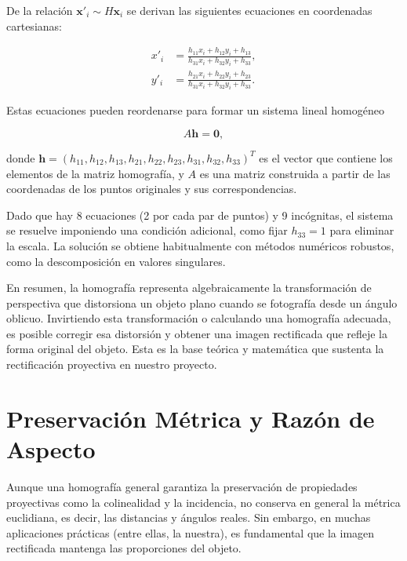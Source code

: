 De la relación \(\mathbf{x}'_i \sim H \mathbf{x}_i\) se derivan las siguientes ecuaciones en coordenadas cartesianas:

\begin{align}
x'_i &= \frac{h_{11} x_i + h_{12} y_i + h_{13}}{h_{31} x_i + h_{32} y_i + h_{33}}, \\
y'_i &= \frac{h_{21} x_i + h_{22} y_i + h_{23}}{h_{31} x_i + h_{32} y_i + h_{33}}.
\end{align}

Estas ecuaciones pueden reordenarse para formar un sistema lineal homogéneo

\begin{equation}
A \mathbf{h} = \mathbf{0},
\label{eq:sistema_homografia}
\end{equation}

donde \(\mathbf{h} = (h_{11}, h_{12}, h_{13}, h_{21}, h_{22}, h_{23}, h_{31}, h_{32}, h_{33})^T\) es el vector que contiene los elementos de la matriz homografía, y \(A\) es una matriz construida a partir de las coordenadas de los puntos originales y sus correspondencias.

Dado que hay 8 ecuaciones (2 por cada par de puntos) y 9 incógnitas, el sistema se resuelve imponiendo una condición adicional, como fijar \(h_{33} = 1\) para eliminar la escala. La solución se obtiene habitualmente con métodos numéricos robustos, como la descomposición en valores singulares.

En resumen, la homografía representa algebraicamente la transformación de perspectiva que distorsiona un objeto plano cuando se fotografía desde un ángulo oblicuo. Invirtiendo esta transformación o calculando una homografía adecuada, es posible corregir esa distorsión y obtener una imagen rectificada que refleje la forma original del objeto. Esta es la base teórica y matemática que sustenta la rectificación proyectiva en nuestro proyecto.


\section{Preservación Métrica y Razón de Aspecto}

Aunque una homografía general garantiza la preservación de propiedades proyectivas como la colinealidad y la incidencia, no conserva en general la métrica euclidiana, es decir, las distancias y ángulos reales. Sin embargo, en muchas aplicaciones prácticas (entre ellas, la nuestra), es fundamental que la imagen rectificada mantenga las proporciones del objeto.

